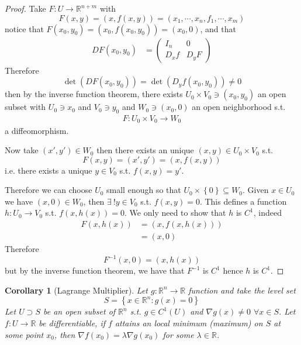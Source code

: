 \documentclass[11pt,a4paper]{article}
\theoremstyle{definition}
\theoremstyle{plain}
\newtheorem{corollary}[definition]{Corollary}
\theoremstyle{remark}
\newcommand{\R}{\mathbb{R}}
\renewcommand{\set}[1]{\left\{ #1 \right\}}
\begin{document}
\begin{proof}
    Take $F \colon U \to \R^{n + m}$ with 
    $$F(x,y) = (x, f(x,y)) = (x_1, \cdots, x_n, f_1, \cdots, x_m)$$
    notice that $F(x_0, y_0) = (x_0, f(x_0, y_0)) = (x_0, 0)$, and that 
    \begin{align*}
        DF(x_0, y_0) &= \begin{pmatrix}
            I_n & 0 \\
            D_x f & D_y F
        \end{pmatrix}
    \end{align*}    
    Therefore 
    $$\det(DF(x_0, y_0)) = \det (D_y f(x_0, y_0)) \ne 0$$
    then by the inverse function theorem, there exists $U_0 \times V_0 \ni (x_0, y_0)$ an open subset with 
    $U_0 \ni x_0$ and $V_0 \ni y_0$ and $W_0 \ni (x_0, 0)$ an open neighborhood s.t. 
    \begin{align*}
        F \colon U_0 \times V_0 \to W_0
    \end{align*}  
    a diffeomorphism.

    Now take $(x', y') \in W_0$ then there exists an unique $(x,y) \in U_0 \times V_0$ s.t. 
    $$F(x,y) = (x', y') = (x, f(x,y))$$
    i.e. there exists a unique $y \in V_0$ s.t. $f(x,y) = y'$. 

    Therefore we can choose $U_0$ small enough so that $U_0 \times \set{0} \subseteq W_0$. Given $x \in U_{0}$ we have 
    $(x, 0) \in W_0$, then $\exists \ ! y \in V_0$ s.t. $f(x,y) = 0$. This defines a function $h \colon U_0 \to V_0$ s.t. 
    $f(x,h (x)) = 0$. We only need to show that $h$ is $C^1$, indeed 
    \begin{align*}
        F(x,h(x)) &= (x, f(x,h(x))) \\
        &= (x, 0) 
    \end{align*}  
    Therefore 
    $$F^{-1} (x, 0) = (x, h(x))$$
    but by the inverse function theorem, we have that $F^{-1}$ is $C^1$ hence $h$ is $C^1$.  
\end{proof}

\begin{corollary}[Lagrange Multiplier]
    Let $g \colon \R^n \to \R$ function and take the level set 
    $$S = \set{x \in \R^n \colon g(x) = 0}$$
    Let $U \supset S$ be an open subset of $\R^n$ s.t. $g \in C^1(U)$ and $\nabla g(x) \ne 0$ $\forall x \in S$. 
    Let $f \colon U \to \R$ be differentiable, if $f$ attains an local minimum (maximum) on $S$ at some point $x_0$, 
    then $\nabla f(x_0) = \lambda \nabla g(x_0)$ for some $\lambda \in \R$.
\end{corollary}
\end{document}
